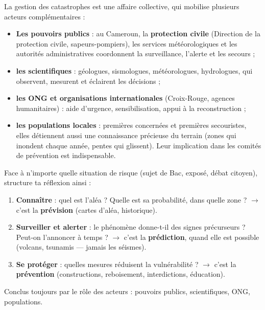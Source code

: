 \documentclass[11pt]{article}
\begin{document}
La gestion des catastrophes est une affaire collective, qui mobilise plusieurs acteurs complémentaires :

\begin{itemize}
\item \textbf{Les pouvoirs publics} : au Cameroun, la \textbf{protection civile} (Direction de la protection civile, sapeurs-pompiers), les services météorologiques et les autorités administratives coordonnent la surveillance, l'alerte et les secours ;
\item \textbf{les scientifiques} : géologues, sismologues, météorologues, hydrologues, qui observent, mesurent et éclairent les décisions ;
\item \textbf{les ONG et organisations internationales} (Croix-Rouge, agences humanitaires) : aide d'urgence, sensibilisation, appui à la reconstruction ;
\item \textbf{les populations locales} : premières concernées et premières secouristes, elles détiennent aussi une connaissance précieuse du terrain (zones qui inondent chaque année, pentes qui glissent). Leur implication dans les comités de prévention est indispensable.
\end{itemize}

\begin{methode}
Face à n'importe quelle situation de risque (sujet de Bac, exposé, débat citoyen), structure ta réflexion ainsi :
\begin{enumerate}
\item \textbf{Connaître} : quel est l'aléa ? Quelle est sa probabilité, dans quelle zone ? $\rightarrow$ c'est la \textbf{prévision} (cartes d'aléa, historique).
\item \textbf{Surveiller et alerter} : le phénomène donne-t-il des signes précurseurs ? Peut-on l'annoncer à temps ? $\rightarrow$ c'est la \textbf{prédiction}, quand elle est possible (volcans, tsunamis — jamais les séismes).
\item \textbf{Se protéger} : quelles mesures réduisent la vulnérabilité ? $\rightarrow$ c'est la \textbf{prévention} (constructions, reboisement, interdictions, éducation).
\end{enumerate}
Conclus toujours par le rôle des acteurs : pouvoirs publics, scientifiques, ONG, populations.
\end{methode}
\end{document}
